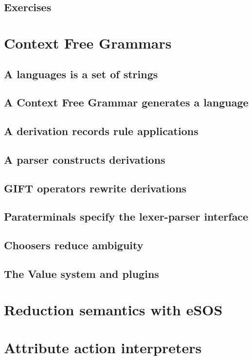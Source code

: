 \documentclass[11pt]{book}
\begin{document}
\section{Exercises}
\chapter{Context Free Grammars}
\label{cfg:chapter}
\section{A languages is a set of strings}
\section{A Context Free Grammar generates a language}
\section{A derivation records rule applications}
\section{A parser constructs derivations}
\section{GIFT operators rewrite derivations}
\section{Paraterminals specify the lexer-parser interface}
\section{Choosers reduce ambiguity}

\label{rewriting:chapter}
\section{The Value system and plugins}
\chapter{Reduction semantics with eSOS}
\label{eSOS:chapter}
\chapter{Attribute action interpreters}
\label{attribute:chapter}
\end{document}
